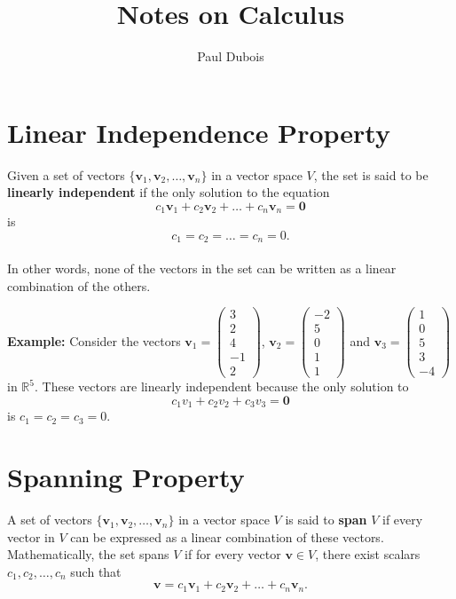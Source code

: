 \documentclass[]{article}
\title{Notes on Calculus}
\author{Paul Dubois}
\date{}
\begin{document}
	
	\maketitle
	
	\begin{abstract}
		
	\end{abstract}
	
	
	\section{Linear Independence Property}
	
	Given a set of vectors $\{\mathbf{v}_1, \mathbf{v}_2, \dots, \mathbf{v}_n\}$ in a vector space $V$, the set is said to be \textbf{linearly independent} if the only solution to the equation
	$$
	c_1\mathbf{v}_1 + c_2\mathbf{v}_2 + \dots + c_n\mathbf{v}_n = \mathbf{0}
	$$
	is 
	$$
	c_1 = c_2 = \dots = c_n = 0.
	$$\\
	In other words, none of the vectors in the set can be written as a linear combination of the others.
	
	\noindent \textbf{Example:}
	Consider the vectors
	$\mathbf{v}_1 = \begin{pmatrix} 3 \\ 2 \\ 4 \\ -1 \\ 2 \end{pmatrix}$,
	$\mathbf{v}_2 = \begin{pmatrix} -2 \\ 5 \\ 0 \\ 1 \\ 1 \end{pmatrix}$
	and
	$\mathbf{v}_3 = \begin{pmatrix} 1 \\ 0 \\ 5 \\ 3 \\ -4 \end{pmatrix}$
	in $\mathbb{R}^5$.
	These vectors are linearly independent because the only solution to
	$$
	c_1v_1 + c_2v_2 + c_3v_3 = \mathbf{0}
	$$
	is $c_1 = c_2 = c_3 = 0$.
	
	\section{Spanning Property}
	
	A set of vectors $\{\mathbf{v}_1, \mathbf{v}_2, \dots, \mathbf{v}_n\}$ in a vector space $V$ is said to \textbf{span} $V$ if every vector in $V$ can be expressed as a linear combination of these vectors.
	Mathematically, the set spans $V$ if for every vector $\mathbf{v} \in V$, there exist scalars $c_1, c_2, \dots, c_n$ such that
	$$
	\mathbf{v} = c_1\mathbf{v}_1 + c_2\mathbf{v}_2 + \dots + c_n\mathbf{v}_n.
	$$
	
\end{document}
